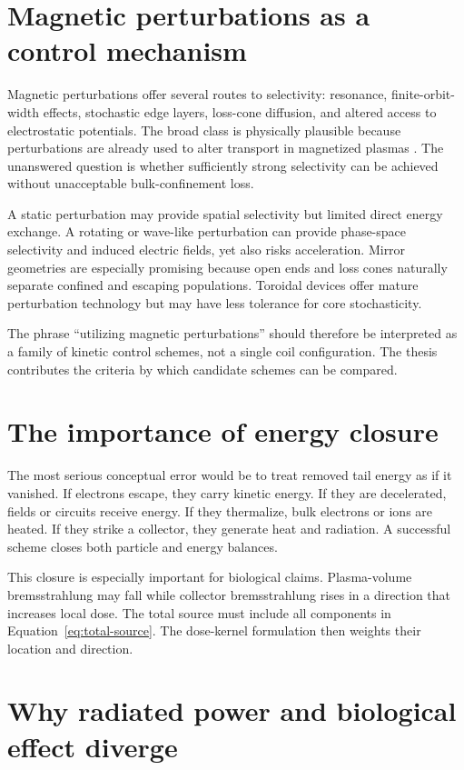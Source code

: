 \section{Magnetic perturbations as a control mechanism}

Magnetic perturbations offer several routes to selectivity: resonance, finite-orbit-width effects, stochastic edge layers, loss-cone diffusion, and altered access to electrostatic potentials. The broad class is physically plausible because perturbations are already used to alter transport in magnetized plasmas \cite{rechester1978,fitzpatrick1993,evans2004}. The unanswered question is whether sufficiently strong selectivity can be achieved without unacceptable bulk-confinement loss.

A static perturbation may provide spatial selectivity but limited direct energy exchange. A rotating or wave-like perturbation can provide phase-space selectivity and induced electric fields, yet also risks acceleration. Mirror geometries are especially promising because open ends and loss cones naturally separate confined and escaping populations. Toroidal devices offer mature perturbation technology but may have less tolerance for core stochasticity.

The phrase ``utilizing magnetic perturbations'' should therefore be interpreted as a family of kinetic control schemes, not a single coil configuration. The thesis contributes the criteria by which candidate schemes can be compared.

\section{The importance of energy closure}

The most serious conceptual error would be to treat removed tail energy as if it vanished. If electrons escape, they carry kinetic energy. If they are decelerated, fields or circuits receive energy. If they thermalize, bulk electrons or ions are heated. If they strike a collector, they generate heat and radiation. A successful scheme closes both particle and energy balances.

This closure is especially important for biological claims. Plasma-volume bremsstrahlung may fall while collector bremsstrahlung rises in a direction that increases local dose. The total source must include all components in Equation~\eqref{eq:total-source}. The dose-kernel formulation then weights their location and direction.

\section{Why radiated power and biological effect diverge}

